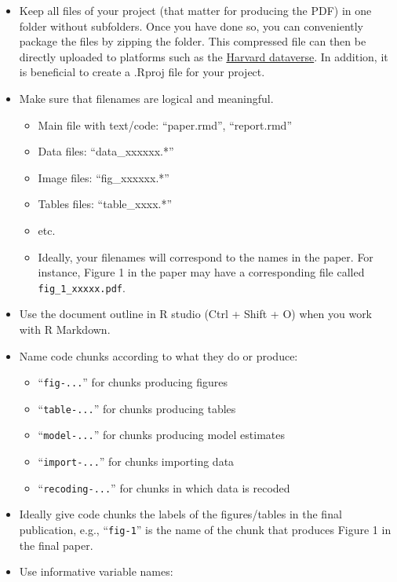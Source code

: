 \documentclass[
  12pt,
]{article}
\providecommand{\tightlist}{%
  \setlength{\itemsep}{0pt}\setlength{\parskip}{0pt}}
\begin{document}
\begin{itemize}
\tightlist
\item
  Keep all files of your project (that matter for producing the PDF) in one folder without subfolders. Once you have done so, you can conveniently package the files by zipping the folder. This compressed file can then be directly uploaded to platforms such as the \href{https://dataverse.harvard.edu/}{Harvard dataverse}. In addition, it is beneficial to create a .Rproj file for your project.
\item
  Make sure that filenames are logical and meaningful.

  \begin{itemize}
  \tightlist
  \item
    Main file with text/code: ``paper.rmd'', ``report.rmd''
  \item
    Data files: ``data\_xxxxxx.*''
  \item
    Image files: ``fig\_xxxxxx.*''
  \item
    Tables files: ``table\_xxxx.*''
  \item
    etc.
  \item
    Ideally, your filenames will correspond to the names in the paper. For instance, Figure 1 in the paper may have a corresponding file called \texttt{fig\_1\_xxxxx.pdf}.
  \end{itemize}
\item
  Use the document outline in R studio (Ctrl + Shift + O) when you work with R Markdown.
\item
  Name code chunks according to what they do or produce:

  \begin{itemize}
  \tightlist
  \item
    ``\texttt{fig-...}'' for chunks producing figures
  \item
    ``\texttt{table-...}'' for chunks producing tables
  \item
    ``\texttt{model-...}'' for chunks producing model estimates
  \item
    ``\texttt{import-...}'' for chunks importing data
  \item
    ``\texttt{recoding-...}'' for chunks in which data is recoded
  \end{itemize}
\item
  Ideally give code chunks the labels of the figures/tables in the final publication, e.g., ``\texttt{fig-1}'' is the name of the chunk that produces Figure 1 in the final paper.
\item
  Use informative variable names:


\end{itemize}
\end{document}
